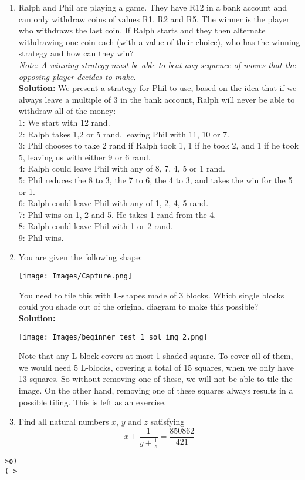 \documentclass{article}
\begin{document}
\begin{enumerate}[1.]
\item Ralph and Phil are playing a game. They have R12 in a bank account and can only withdraw coins of values R1, R2 and R5. The winner is the player who withdraws the last coin. If Ralph starts and they then alternate withdrawing one coin each (with a value of their choice), who has the winning strategy and how can they win?\\
\textit{Note: A winning strategy must be able to beat any sequence of moves that the opposing player decides to make.}\\

\textbf{Solution:}
We present a strategy for Phil to use, based on the idea that if we always leave a multiple of 3 in the bank account, Ralph will never be able to withdraw all of the money:\\
1: We start with 12 rand.\\
2: Ralph takes 1,2 or 5 rand, leaving Phil with 11, 10 or 7.\\
3: Phil chooses to take 2 rand if Ralph took 1, 1 if he took 2, and 1 if he took 5, leaving us with either 9 or 6 rand.\\
4: Ralph could leave Phil with any of 8, 7, 4, 5 or 1 rand.\\
5: Phil reduces the 8 to 3, the 7 to 6, the 4 to 3, and takes the win for the 5 or 1.\\
6: Ralph could leave Phil with any of 1, 2, 4, 5 rand.\\
7: Phil wins on 1, 2 and 5. He takes 1 rand from the 4.\\
8: Ralph could leave Phil with 1 or 2 rand.\\
9: Phil wins.\\



\item You are given the following shape: %
\begin{center}
	\texttt{[image: Images/Capture.png]}	
\end{center}
	You need to tile this with L-shapes made of 3 blocks. Which single blocks could you shade out of the original diagram to make this possible?\\
	
\textbf{Solution:}\\
\begin{center}
	\texttt{[image: Images/beginner\_test\_1\_sol\_img\_2.png]}	
\end{center}
Note that any L-block covers at most 1 shaded square. To cover all of them, we would need 5 L-blocks, covering a total of 15 squares, when we only have 13 squares. So without removing one of these, we will not be able to tile the image. On the other hand, removing one of these squares always results in a possible tiling. This is left as an exercise.


\item %
Find all natural numbers $x$, $y$ and $z$ satisfying 
$$x + \frac{1}{y + \frac{1}{z}} = \frac{850862}{421}$$


\end{enumerate}


\vfill
\centering
\begin{BVerbatim}
>o)
(_>
\end{BVerbatim}
\end{document}
